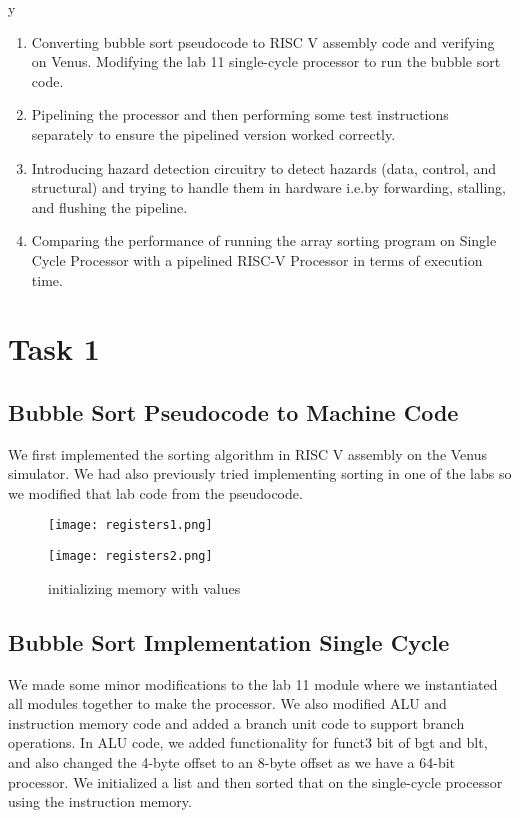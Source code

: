 y\documentclass[12pt]{article}
\begin{document}
\begin{enumerate}
    \item Converting bubble sort pseudocode to RISC V assembly code and verifying on Venus. Modifying the lab 11 single-cycle processor to run the bubble sort code.
    \item Pipelining the processor and then performing some test instructions separately to ensure the pipelined version worked correctly.
    \item Introducing hazard detection circuitry to detect hazards (data, control, and structural) and trying to handle them in hardware i.e.by forwarding, stalling, and flushing the pipeline.
    \item Comparing the performance of running the array sorting program on Single Cycle Processor with a pipelined RISC-V Processor in terms of execution time.
    
\end{enumerate}

\section{Task 1}\label{task1}
    \subsection{Bubble Sort Pseudocode to Machine Code}\label{task1-0}
        We first implemented the sorting algorithm in RISC V assembly on the Venus simulator. We had also previously tried implementing sorting in one of the labs so we modified that lab code from the pseudocode. 
        
        \begin{figure}[htbp!]
            \centering
            \texttt{[image: registers1.png]}
        \end{figure}
        \begin{figure}[htbp!]
            \centering
            \texttt{[image: registers2.png]}
            \caption{initializing memory with values}
        \end{figure}
        
\newpage

    \subsection{Bubble Sort Implementation Single Cycle}\label{task1-1}
        We made some minor modifications to the lab 11 module where we instantiated all modules together to make the processor. We also modified ALU and instruction memory code and added a branch unit code to support branch operations. In ALU code, we added functionality for funct3 bit of bgt and blt, and also changed the 4-byte offset to an 8-byte offset as we have a 64-bit processor. We initialized a list and then sorted that on the single-cycle processor using the instruction memory. 
\end{document}
